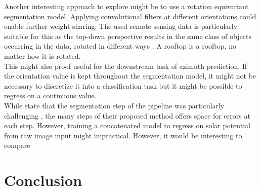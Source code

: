 \documentclass{article} %
\begin{document}
Another interesting approach to explore might be to use a rotation equivariant segmentation model. Applying convolutional filters at different orientations could enable further weight sharing. The used remote sensing data is particularly suitable for this as the top-down perspective results in the same class of objects occurring in the data, rotated in different ways \cite{marcos2018land}. A rooftop is a rooftop, no matter how it is rotated.\\
This might also proof useful for the downstream task of azimuth prediction. If the orientation value is kept throughout the segmentation model, it might not be necessary to discretize it into a classification task but it might be possible to regress on a continuous value.\\
While \citet{de2021predicting} state that the segmentation step of the pipeline was particularly challenging \cite{Andrieux_2021}, the many steps of their proposed method offers space for errors at each step. However, training a concatenated model to regress on solar potential from raw image input might impractical. However, it would be interesting to compare






\section*{Conclusion}




\newpage



\end{document}
